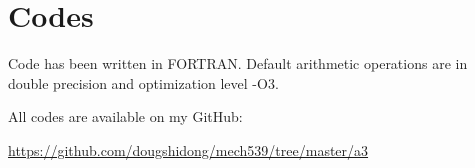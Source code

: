 \documentclass[letterpaper,12pt,]{article}
\begin{document}
\clearpage
\section*{Codes}

Code has been written in FORTRAN. Default arithmetic operations are in double precision and optimization level -O3.

All codes are available on my GitHub:

\url{https://github.com/dougshidong/mech539/tree/master/a3}
\end{document}
